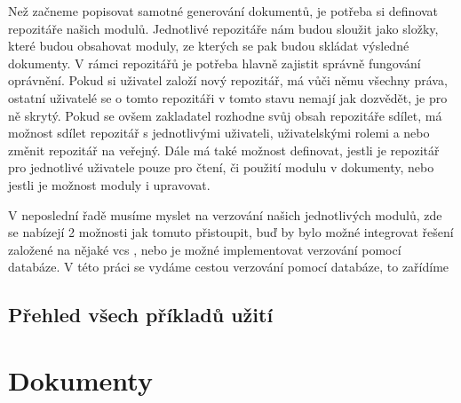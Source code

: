 Než začneme popisovat samotné generování dokumentů, je potřeba si definovat repozitáře našich modulů. Jednotlivé repozitáře nám budou sloužit jako složky,
které budou obsahovat moduly, ze kterých se pak budou skládat výsledné dokumenty. V rámci repozitářů je potřeba hlavně zajistit správně fungování oprávnění.
Pokud si uživatel založí nový repozitář, má vůči němu všechny práva, ostatní uživatelé se o tomto repozitáři v tomto stavu nemají jak dozvědět, je pro ně
skrytý. Pokud se ovšem zakladatel rozhodne svůj obsah repozitáře sdílet, má možnost sdílet repozitář s jednotlivými uživateli, uživatelskými rolemi a nebo
změnit repozitář na veřejný. Dále má také možnost definovat, jestli je repozitář pro jednotlivé uživatele pouze pro čtení, či použití modulu v dokumenty,
nebo jestli je možnost moduly i upravovat.

V neposlední řadě musíme myslet na verzování našich jednotlivých modulů, zde se nabízejí 2 možnosti jak tomuto přistoupit, buď by bylo možné integrovat
řešení založené na nějaké vcs , nebo je možné implementovat verzování pomocí databáze. V této práci se vydáme cestou
verzování pomocí databáze, to zařídíme

\subsection{Přehled všech příkladů užití}

\section{Dokumenty}

